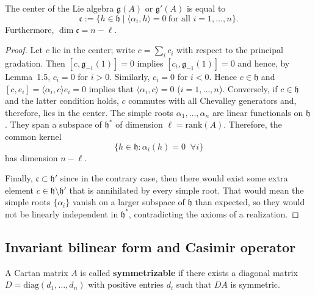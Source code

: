 \documentclass[12pt]{article}
\begin{document}
\begin{proposition}
    The center of the Lie algebra $\mathfrak{g}(A)$ or $\mathfrak{g}'(A)$ is equal to
    \[
        \mathfrak{c} := \{ h \in \mathfrak{h} \mid \langle \alpha_i, h \rangle = 0
        \ \text{for all } i=1,\dots,n \}.
    \]
    Furthermore, $\dim \mathfrak{c} = n-\ell$.
\end{proposition}

\begin{proof}
    Let $c$ lie in the center; write $c = \sum_i c_i$ with respect to the principal
    gradation. Then $[c,\mathfrak{g}_{-1}(1)] = 0$ implies
    $[c_i,\mathfrak{g}_{-1}(1)] = 0$ and hence, by Lemma~1.5, $c_i = 0$ for $i>0$.
    Similarly, $c_i=0$ for $i<0$. Hence $c \in \mathfrak{h}$ and
    $[c,e_i] = \langle \alpha_i,c \rangle e_i = 0$ implies that
    $\langle \alpha_i,c \rangle = 0$ ($i=1,\dots,n$). Conversely, if $c \in \mathfrak{h}$
    and the latter condition holds, $c$ commutes with all Chevalley generators and, therefore, lies in the center. The simple roots $\alpha_1,\dots,\alpha_n$ are linear functionals on $\mathfrak{h}$. They span a subspace of $\mathfrak{h}^*$ of dimension $\ell = \mathrm{rank}(A)$. Therefore, the common kernel
    \[
        \{ h \in \mathfrak{h} : \alpha_i(h)=0 \;\;\forall i\}
    \]
    has dimension $n-\ell$.

    Finally, $\mathfrak{c} \subset \mathfrak{h}'$ since in the contrary case, then there would exist some extra element $c \in \mathfrak{h} \setminus \mathfrak{h}'$ that is annihilated by every simple root. That would mean the simple roots $\{\alpha_i\}$ vanish on a larger subspace of $\mathfrak{h}$ than expected, so they would not be linearly independent in $\mathfrak{h}^*$, contradicting the axioms of a realization.
\end{proof}

\subsection{Invariant bilinear form and Casimir operator}
\begin{definition}
    A Cartan matrix $A$ is called \textbf{symmetrizable} if there exists a diagonal matrix $D = \mathrm{diag}(d_1,\dots,d_n)$ with positive entries $d_i$ such that $DA$ is symmetric.
\end{definition}
\end{document}
